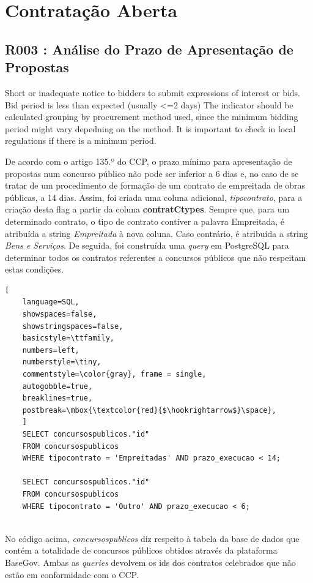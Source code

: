 \section{Contratação Aberta}

\subsection{R003 : Análise do Prazo de Apresentação de Propostas}


\Lemma{}
{
	Short or inadequate notice to bidders to submit expressions of interest or bids. Bid period is less than expected (usually <=2 days)
	The indicator should be calculated grouping by procurement method used, since the minimum bidding period might vary depedning on the method.  It is important to check in local regulations if there is a minimun period.  
}


De acordo com o artigo 135.º do CCP, o prazo mínimo para apresentação de propostas num concurso público não pode ser inferior a 6 dias e, no caso de se tratar de um procedimento de formação de um contrato de empreitada de obras públicas, a 14 dias. Assim, foi criada uma coluna adicional, \textit{tipocontrato}, para a criação desta flag a partir da coluna \textbf{contratCtypes}. Sempre que, para um determinado contrato, o tipo de contrato contiver a palavra Empreitada, é atribuída a string \textit{Empreitada} à nova coluna. Caso contrário, é atribuída a string \textit{Bens e Serviços}. De seguida, foi construída uma \textit{query} em PostgreSQL para determinar todos os contratos referentes a concursos públicos que não respeitam estas condições. \\


\begin{lstlisting}[
	language=SQL,
	showspaces=false,
	showstringspaces=false,
	basicstyle=\ttfamily,
	numbers=left,
	numberstyle=\tiny,
	commentstyle=\color{gray}, frame = single,
	autogobble=true,
	breaklines=true,
	postbreak=\mbox{\textcolor{red}{$\hookrightarrow$}\space},
	]
	SELECT concursospublicos."id"
	FROM concursospublicos
	WHERE tipocontrato = 'Empreitadas' AND prazo_execucao < 14;
	
	SELECT concursospublicos."id"
	FROM concursospublicos
	WHERE tipocontrato = 'Outro' AND prazo_execucao < 6;
	
\end{lstlisting}


No código acima, \textit{concursospublicos} diz respeito à tabela da base de dados que contém a totalidade de concursos públicos obtidos através da plataforma BaseGov. Ambas as \textit{queries} devolvem os ids dos contratos celebrados que não estão em conformidade com o CCP. 




